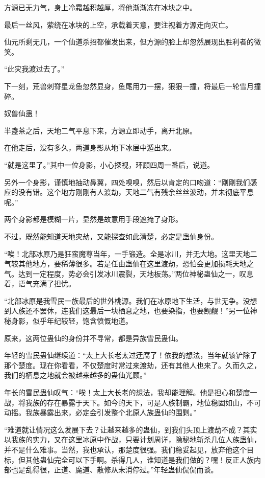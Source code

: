 \begin{this_body}
方源已无力气，身上冷霜越积越厚，将他渐渐冻在冰块之中。

最后一丝风，萦绕在冰块的上空，承载着天意，要注视着方源走向灭亡。

仙元所剩无几，一个仙道杀招都催发出来，但方源的脸上却忽然展现出胜利者的微笑。

“此灾我渡过去了。”

下一刻，荒兽刺脊星龙鱼忽然显身，鱼尾用力一摆，狠狠一撞，将最后一轮雪月撞碎。

奴兽仙蛊！

半盏茶之后，天地二气平息下来，方源立即动手，离开北原。

在他走后，没有多久，两道身影从地下冰层中遁出来。

“就是这里了。”其中一位身影，小心探视，环顾四周一番后，说道。

另外一个身影，谨慎地抽动鼻翼，四处嗅嗅，然后以肯定的口吻道：“刚刚我们感应的没有错。这个地方刚刚有人渡劫，天地二气有残余丝丝波动，并未彻底平息呢。”

两个身影都是模糊一片，显然是故意用手段遮掩了身形。

不过，既然能知道天地灾劫，又能探查如此清楚，必定是蛊仙身份。

“唉！北部冰原乃是狂蛮魔尊当年，一手锻造。全是冰川，并无大地。这里天地二气较其他地方，要稀薄很多。若是任由蛊仙在这里渡劫，恐怕会更加损耗天地之气。达到一定程度，势必会引发冰川震裂，天地板荡。”两位神秘蛊仙之一，叹息着，语气充满了担忧。

“北部冰原是我雪民一族最后的世外桃源。我们在冰原地下生活，与世无争。没想到人族还不罢休，连我们这最后一块栖息之地，也要染指，也要觊觎！”另一位神秘身影，似乎年纪较轻，饱含愤慨地道。

原来，这两位蛊仙的身份并不寻常，都是异族雪民蛊仙。

年轻的雪民蛊仙继续道：“太上大长老太过迂腐了！依我的想法，当年就该铲除了那个楚度。现在你看看，不仅楚度时常过来渡劫，还有其他人也来了。久而久之，我们的栖息之地就会被越来越多的蛊仙光顾。”

年长的雪民蛊仙叹气：“唉！太上大长老的想法，我却能理解。他是担心和楚度一战，将我族的存在暴露于天下。如今的天下，可是人族制霸，地位稳固如山，不可动摇。我族暴露出来，必定会引发整个北原人族蛊仙的围剿。”

“难道就让情况这么发展下去？让越来越多的蛊仙，到我们头顶上渡劫不成？其实以我族的实力，又在这里冰原中作战，只要计划周详，隐秘地斩杀几位人族蛊仙，并不是什么难事。当然，我也承认，那楚度很强。我们稳妥起见，放弃他这个目标，但其他蛊仙完全可以下手啊。杀得几人，谁知道是我们做的？嘿！反正人族内部也是乱得很，正道、魔道、散修从未消停过。”年轻蛊仙侃侃而谈。


\end{this_body}
